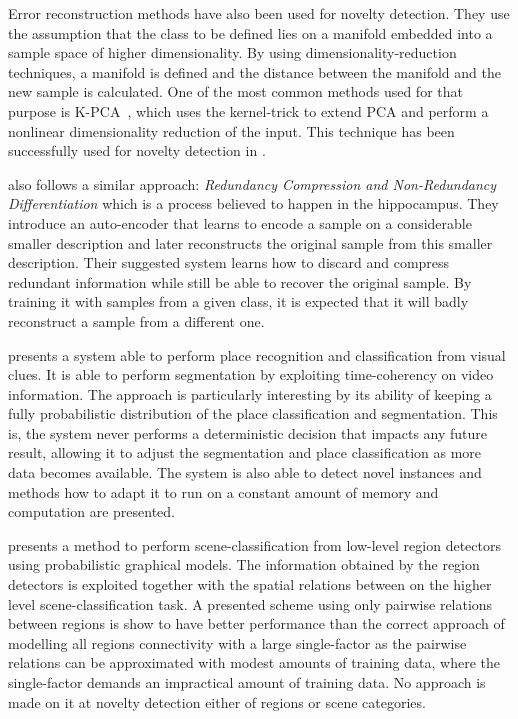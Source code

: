 Error reconstruction methods have also been used for novelty detection.
They use the assumption that the class to be defined lies on a manifold embedded
into a sample space of higher dimensionality. By using dimensionality\hyp{}reduction
techniques, a manifold is defined and the distance between the manifold and the new sample
is calculated. One of the most common methods used for that purpose is
\gls{K-PCA}~\cite{scholkopf1997kernel}, which uses the kernel-trick to extend
\gls{PCA} and perform a nonlinear dimensionality reduction of the input.
This technique has been successfully used for novelty detection in \cite{Hoffmann2007863}.

\cite{japkowicz1995novelty} also follows a similar approach: \emph{Redundancy
Compression and Non-Redundancy Differentiation} which is a process believed
to happen in the hippocampus. They introduce an auto-encoder
that learns to encode a sample on a considerable smaller description and later reconstructs
the original sample from this smaller description. Their suggested system
learns how to discard and compress redundant information while still be able to recover
the original sample. By training it with samples from a given class, it
is expected that it will badly reconstruct a sample from a different one.

\cite{ranganathan2010pliss} presents a system able to perform place recognition
and classification from visual clues. It is able to perform segmentation by
exploiting time-coherency on video information. The approach is particularly
interesting by its ability of keeping a fully probabilistic distribution of
the place classification and segmentation. This is, the system never performs
a deterministic decision that impacts any future result, allowing it to adjust
the segmentation and place classification as more data becomes available.
The system is also able to detect novel instances and methods how to adapt it
to run on a constant amount of memory and computation are presented.

\cite{boutell2006factor} presents a method to perform scene-classification
from low-level region detectors using probabilistic graphical models.
The information obtained by the region detectors is exploited together with the
spatial relations between on the higher level scene-classification task.
A presented scheme using only pairwise relations between regions is show to
have better performance than the correct approach of modelling all regions connectivity
with a large single-factor as the pairwise relations can be
approximated with modest amounts of training data, where the single-factor
demands an impractical amount of training data.
No approach is made on it at novelty detection either of regions or scene
categories. 


